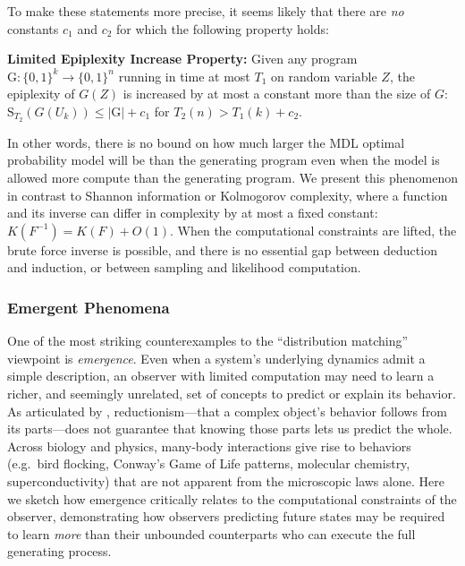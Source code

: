\documentclass[twoside]{article}
\newcommand{\rS}{\mathrm{S}}
\begin{document}
To make these statements more precise, it seems likely that there are \emph{no} constants $c_1$ and $c_2$ for which the following property holds:
\begin{remarkbox}{}
\label{def:induction_def}
\textbf{Limited Epiplexity Increase Property:} Given any program $\mathrm{G}:\{0,1\}^k\to \{0,1\}^n$ running in time at most $T_1$ on random variable $Z$, the epiplexity of $G(Z)$ is increased by at most a constant more than the size of $G$:
$\rS_{T_2}(G(U_k)) \le |\mathrm{G}|+c_1$ for $T_2(n)>T_1(k)+c_2$.


%
%
%
\end{remarkbox}
%
    
%
In other words, there is no bound on how much larger the MDL optimal probability model will be than the generating program even when the model is allowed more compute than the generating program. We present this phenomenon in contrast to Shannon information or Kolmogorov complexity, where a function and its inverse can differ in complexity by at most a fixed constant: $K(F^{-1}) = K(F)+O(1)$. When the computational constraints are lifted, the brute force inverse is possible, and there is no essential gap between deduction and induction, or between sampling and likelihood computation.
%
%
%
%
%

%
%

%


%
%

%
%

%
%





\subsubsection{Emergent Phenomena}
\label{sec:emergent}

One of the most striking counterexamples to the ``distribution matching'' viewpoint is \emph{emergence}. Even when a system’s underlying dynamics admit a simple description, an observer with limited computation may need to learn a richer, and seemingly unrelated, set of concepts to predict or explain its behavior. As articulated by \citet{anderson1972more}, reductionism---that a complex object’s behavior follows from its parts---does not guarantee that knowing those parts lets us predict the whole. Across biology and physics, many‐body interactions give rise to behaviors (e.g.\ bird flocking, Conway’s Game of Life patterns, molecular chemistry, superconductivity) that are not apparent from the microscopic laws alone. Here we sketch how emergence critically relates to the computational constraints of the observer, demonstrating how observers predicting future states may be required to learn \emph{more} than their unbounded counterparts who can execute the full generating process. %
\end{document}
